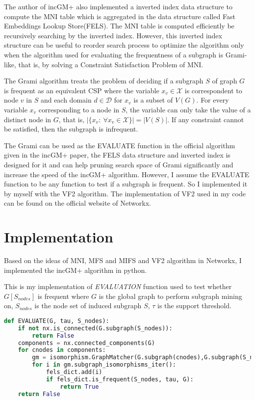 \documentclass[a4paper, 12pt]{report}
\newcounter{i}
\begin{document}
The author of incGM+ also implemented a inverted index data structure to compute the MNI table which is aggregated in the data structure called Fast Embeddings Lookup Store(FELS)\cite{incGM}. The MNI table is computed efficiently be recursively searching by the inverted index. However, this inverted index structure can be useful to reorder search process to optimize the algorithm only when the algorithm used for evaluating the frequentness of a subgraph is
Grami-like\cite{grami}, that is, by solving a Constraint Satisfaction Problem of MNI.

The Grami algorithm\cite{grami} treats the problem of deciding if a subgraph $S$ of graph $G$ is frequent as an equivalent CSP where the variable $x_v\in \mathcal X$ is correspondent to node $v$ in $S$ and each domain $d\in\mathcal D$ for $x_v$ is a subset of $V(G)$. For every variable $x_v$ corresponding to a node in $S$, the variable can only take the value of a distinct node in $G$, that is, $|\{x_v:\ \forall x_v\in \mathcal X\}|=|V(S)|$. If any constraint cannot be satisfied, then the subgraph is infrequent.

The Grami can be used as the EVALUATE function in the official algorithm given in the incGM+ paper, the FELS data structure and inverted index is designed for it and can help pruning search space of Grami significantly and increase the speed of the incGM+ algorithm. However, I assume the EVALUATE function to be any function to test if a subgraph is frequent. So I implemented it by myself with the VF2 algorithm\cite{VF2}. The implementation of VF2 used in my code can be found
on the official website of Networkx.

\chapter {Implementation}
Based on the ideas of MNI, MFS and MIFS and VF2 algorithm in Networkx, I implemented the incGM+ algorithm in python.

This is my implementation of \emph{EVALUATION} function used to test whether $G[S_{nodes}]$ is frequent where $G$ is the global graph to perform subgraph mining on, $S_{nodes}$ is the node set of induced subgraph $S$, $\tau$ is the support threshold.
\begin{lstlisting}[language=python, frame=single]
def EVALUATE(G, tau, S_nodes):
    if not nx.is_connected(G.subgraph(S_nodes)):
        return False
    components = nx.connected_components(G)
    for cnodes in components:
        gm = isomorphism.GraphMatcher(G.subgraph(cnodes),G.subgraph(S_nodes))
        for i in gm.subgraph_isomorphisms_iter():
            fels_dict.add(i)
            if fels_dict.is_frequent(S_nodes, tau, G):
                return True
    return False
\end{lstlisting}
\end{document}
